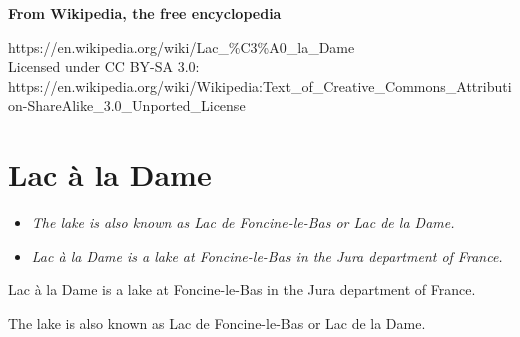 \textbf{From Wikipedia, the free encyclopedia}

https://en.wikipedia.org/wiki/Lac\_\%C3\%A0\_la\_Dame\\
Licensed under CC BY-SA 3.0:\\
https://en.wikipedia.org/wiki/Wikipedia:Text\_of\_Creative\_Commons\_Attribution-ShareAlike\_3.0\_Unported\_License

\section{Lac à la Dame}\label{lac-uxe0-la-dame}

\begin{itemize}
\item
  \emph{The lake is also known as Lac de Foncine-le-Bas or Lac de la
  Dame.}
\item
  \emph{Lac à la Dame is a lake at Foncine-le-Bas in the Jura department
  of France.}
\end{itemize}

Lac à la Dame is a lake at Foncine-le-Bas in the Jura department of
France.

The lake is also known as Lac de Foncine-le-Bas or Lac de la Dame.
